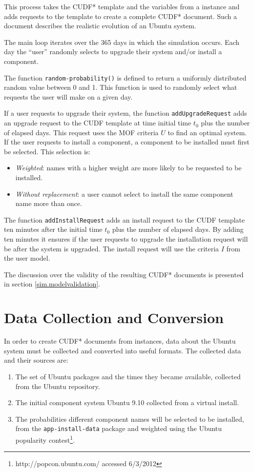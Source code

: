 This process takes the CUDF* template and the variables from a \usermodel instance and adds requests to the template to  create a complete CUDF* document.
Such a document describes the realistic evolution of an Ubuntu system.

The main loop iterates over the 365 days in which the simulation occurs.
Each day the ``user'' randomly selects to upgrade their system and/or install a component.

The function \texttt{random-probability()} is defined to return a uniformly distributed random value between 0 and 1.
This function is used to randomly select what requests the user will make on a given day.

If a user requests to upgrade their system, 
the function \texttt{addUpgradeRequest} adds an upgrade request to the CUDF template at time initial time $t_0$ plus the number of elapsed days.
This request uses the MOF criteria $U$ to find an optimal system.
If the user requests to install a component, a component to be installed must first be selected.
This selection is: 
\begin{itemize}
  \item \textit{Weighted}: names with a higher weight are more likely to be requested to be installed.
  \item \textit{Without replacement}: a user cannot select to install the same component name more than once.
\end{itemize} 
The function \texttt{addInstallRequest} adds an install request to the CUDF template ten minutes after the initial time $t_0$ plus the number of elapsed days.
By adding ten minutes it ensures if the user requests to upgrade the installation request will be after the system is upgraded.
The install request will use the criteria $I$ from the user model.

The discussion over the validity of the resulting CUDF* documents is presented in section \ref{sim.modelvalidation}.

\section{\usermodel Data Collection and Conversion}
\label{sim.collection}
In order to create CUDF* documents from \usermodel instances, data about the Ubuntu system must be collected and converted into useful formats.
The collected data and their sources are:
\begin{enumerate}
  \item The set of Ubuntu packages and the times they became available, collected from the Ubuntu repository.
  \item The initial component system Ubuntu 9.10 collected from a virtual install.
  \item The probabilities different component names will be selected to be installed, from the \texttt{app-install-data} package and weighted using 
  the Ubuntu popularity contest\footnote{http://popcon.ubuntu.com/ accessed 6/3/2012}.
\end{enumerate}

